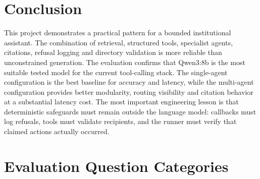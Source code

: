 \documentclass[11pt,a4paper]{article}
\begin{document}
\section{Conclusion}
\label{sec:conclusion}

This project demonstrates a practical pattern for a bounded institutional assistant. The combination of retrieval, structured tools, specialist agents, citations, refusal logging and directory validation is more reliable than unconstrained generation. The evaluation confirms that Qwen3:8b is the most suitable tested model for the current tool-calling stack. The single-agent configuration is the best baseline for accuracy and latency, while the multi-agent configuration provides better modularity, routing visibility and citation behavior at a substantial latency cost. The most important engineering lesson is that deterministic safeguards must remain outside the language model: callbacks must log refusals, tools must validate recipients, and the runner must verify that claimed actions actually occurred.

\appendix
\section{Evaluation Question Categories}
\label{app:questions}
\end{document}
